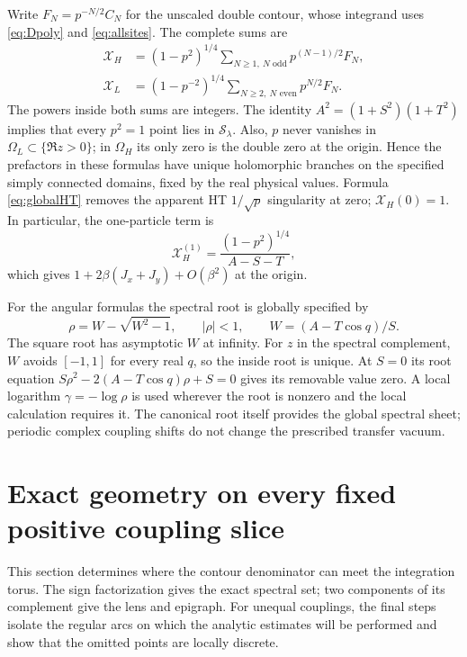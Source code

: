 \documentclass[11pt]{article}
\numberwithin{equation}{section}
\theoremstyle{definition}
\newcommand{\cS}{\mathcal S}
\newcommand{\OH}{\Omega_H}
\newcommand{\OL}{\Omega_L}
\newcommand{\XH}{\mathcal X_H}
\newcommand{\XL}{\mathcal X_L}
\begin{document}
Write $F_N=p^{-N/2}C_N$ for the unscaled double contour, whose integrand
uses \eqref{eq:Dpoly} and \eqref{eq:allsites}. The complete sums are
\begin{align}
 \XH&=(1-p^2)^{1/4}\sum_{N\ge1,\ N\text{ odd}}p^{(N-1)/2}F_N,
                                                        \label{eq:globalHT}\\
 \XL&=(1-p^{-2})^{1/4}\sum_{N\ge2,\ N\text{ even}}p^{N/2}F_N.
                                                        \label{eq:globalLT}
\end{align}
The powers inside both sums are integers. The identity
$A^2=(1+S^2)(1+T^2)$ implies that every $p^2=1$ point lies in
$\cS_\lambda$. Also, $p$ never vanishes in $\OL\subset\{\Re z>0\}$;
in $\OH$ its only zero is the double zero at the origin. Hence the
prefactors in these formulas have unique holomorphic branches on the
specified simply connected domains, fixed by the real physical values.
Formula \eqref{eq:globalHT} removes the apparent HT $1/\sqrt p$
singularity at zero; $\XH(0)=1$. In particular, the one-particle term is
\[
 \XH^{(1)}=\frac{(1-p^2)^{1/4}}{A-S-T},
\]
which gives $1+2\beta(J_x+J_y)+O(\beta^2)$ at the origin.

For the angular formulas the spectral root is globally specified by
\[
 \rho=W-\sqrt{W^2-1},\qquad |\rho|<1,
 \qquad W=(A-T\cos q)/S.
\]
The square root has asymptotic $W$ at infinity. For $z$ in the spectral
complement, $W$ avoids $[-1,1]$ for every real $q$, so the inside root
is unique. At $S=0$ its root equation
$S\rho^2-2(A-T\cos q)\rho+S=0$ gives its removable value zero.
A local logarithm $\gamma=-\log\rho$ is used wherever the root is
nonzero and the local calculation requires it. The canonical root itself
provides the global spectral sheet; periodic complex coupling shifts do
not change the prescribed transfer vacuum.



\section{Exact geometry on every fixed positive coupling slice}\label{sec:geometry}

This section determines where the contour denominator can meet the
integration torus. The sign factorization gives the exact spectral set;
two components of its complement give the lens and epigraph. For unequal
couplings, the final steps isolate the regular arcs on which the analytic
estimates will be performed and show that the omitted points are locally
discrete.
\end{document}

